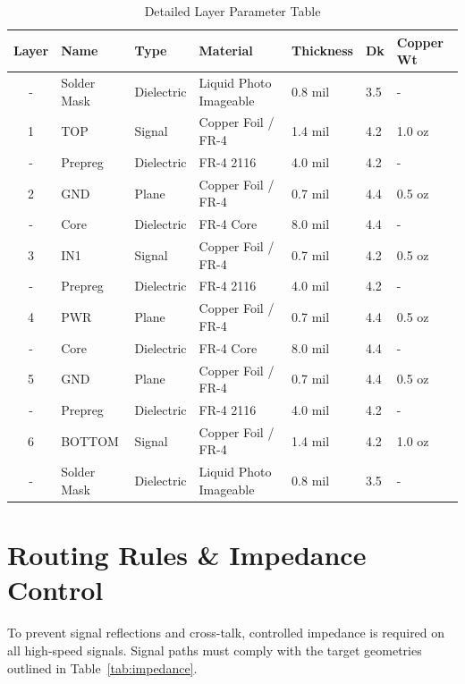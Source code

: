 \documentclass[11pt,a4paper]{article}
\begin{document}
\begin{table}[h]
\centering
\fontsize{9}{11}\selectfont
\begin{tabularx}{\textwidth}{c l l p{3.0cm} l l l}
\rowcolor{primary}
\color{white}\textbf{Layer} & \color{white}\textbf{Name} & \color{white}\textbf{Type} & \color{white}\textbf{Material} & \color{white}\textbf{Thickness} & \color{white}\textbf{Dk} & \color{white}\textbf{Copper Wt} \\
\midrule
- & Solder Mask & Dielectric & Liquid Photo Imageable & 0.8 mil & 3.5 & - \\
\rowcolor{lightbg}
1 & TOP & Signal & Copper Foil / FR-4 & 1.4 mil & 4.2 & 1.0 oz \\
- & Prepreg & Dielectric & FR-4 2116 & 4.0 mil & 4.2 & - \\
\rowcolor{lightbg}
2 & GND & Plane & Copper Foil / FR-4 & 0.7 mil & 4.4 & 0.5 oz \\
- & Core & Dielectric & FR-4 Core & 8.0 mil & 4.4 & - \\
\rowcolor{lightbg}
3 & IN1 & Signal & Copper Foil / FR-4 & 0.7 mil & 4.2 & 0.5 oz \\
- & Prepreg & Dielectric & FR-4 2116 & 4.0 mil & 4.2 & - \\
\rowcolor{lightbg}
4 & PWR & Plane & Copper Foil / FR-4 & 0.7 mil & 4.4 & 0.5 oz \\
- & Core & Dielectric & FR-4 Core & 8.0 mil & 4.4 & - \\
\rowcolor{lightbg}
5 & GND & Plane & Copper Foil / FR-4 & 0.7 mil & 4.4 & 0.5 oz \\
- & Prepreg & Dielectric & FR-4 2116 & 4.0 mil & 4.2 & - \\
\rowcolor{lightbg}
6 & BOTTOM & Signal & Copper Foil / FR-4 & 1.4 mil & 4.2 & 1.0 oz \\
- & Solder Mask & Dielectric & Liquid Photo Imageable & 0.8 mil & 3.5 & - \\
\bottomrule
\end{tabularx}
\caption{Detailed Layer Parameter Table}
\label{tab:stackup}
\end{table}

\newpage

\section{Routing Rules \& Impedance Control}
To prevent signal reflections and cross-talk, controlled impedance is required on all high-speed signals. Signal paths must comply with the target geometries outlined in Table~\ref{tab:impedance}.
\end{document}
